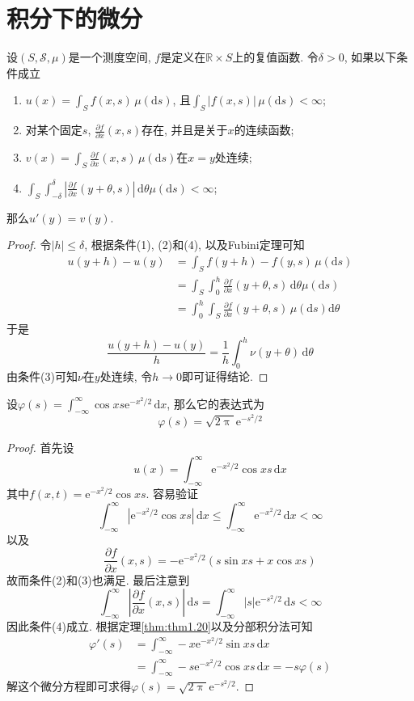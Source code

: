 \documentclass[cn, 12pt, math=mtpro2, bibstyle=apa, blue, twocol]{elegantbook}
\newcommand{\R}{\mathbb{R}}
\newcommand{\SE}{\mathcal{S}}
\begin{document}
\section{积分下的微分}
\begin{theorem}\label{thm:thm1.20}
  设$(S,\SE,\mu)$是一个测度空间, $f$是定义在$\R\times S$上的复值函数. 令$\delta>0$, 如果以下条件成立
  \begin{enumerate}[label=(\arabic*)]
    \item $u(x)=\int_Sf(x,s)\,\mu(\text{d}s)$, 且$\int_S|f(x,s)|\,\mu(\text{d}s)<\infty$;
    \item 对某个固定$s$, $\frac{\partial f}{\partial x}(x,s)$存在, 并且是关于$x$的连续函数;
    \item $v(x)=\int_S\frac{\partial f}{\partial x}(x,s)\,\mu(\text{d}s)$在$x=y$处连续;
    \item $\int_S\int_{-\delta}^{\delta}\left|\frac{\partial f}{\partial x}(y+\theta,s)\right|\,\text{d}\theta\mu(\text{d}s)<\infty$;
  \end{enumerate}
  那么$u'(y)=v(y)$.
\end{theorem}
\begin{proof}
  令$|h|\leq\delta$, 根据条件(1), (2)和(4), 以及Fubini定理可知
  \begin{align*}
  u(y+h)-u(y)&=\int_S f(y+h)-f(y,s)\,\mu(\text{d}s) \\
  &=\int_{S}\int_{0}^{h}\frac{\partial f}{\partial x}(y+\theta,s)\,\text{d}\theta\mu(\text{d}s) \\
  &=\int_{0}^{h}\int_S \frac{\partial f}{\partial x}(y+\theta,s)\,\mu(\text{d}s)\text{d}\theta
  \end{align*}
  于是
  $$\frac{u(y+h)-u(y)}{h}=\frac{1}{h}\int_{0}^{h}\nu(y+\theta)\,\text{d}\theta$$
  由条件(3)可知$\nu$在$y$处连续, 令$h\to0$即可证得结论.
\end{proof}
\begin{example}
设$\varphi(s)=\int_{-\infty}^{\infty}\cos xs\text{e}^{-x^2/2}\,\text{d}x$, 那么它的表达式为
$$\varphi(s)=\sqrt{2\uppi}\text{e}^{-s^2/2}$$
\end{example}
\begin{proof}
  首先设
  $$u(x)=\int_{-\infty}^{\infty}\text{e}^{-x^2/2}\cos xs\,\text{d}x$$
  其中$f(x,t)=\text{e}^{-x^2/2}\cos xs$. 容易验证
  $$\int_{-\infty}^{\infty}|\text{e}^{-x^2/2}\cos xs|\,\text{d}x\leq \int_{-\infty}^{\infty}\text{e}^{-x^2/2}\,\text{d}x<\infty$$
  以及
  $$\frac{\partial f}{\partial x}(x,s)=-\text{e}^{-x^2/2}(s\sin xs+x\cos xs)$$
  故而条件(2)和(3)也满足. 最后注意到
  $$\int_{-\infty}^{\infty}\left|\frac{\partial f}{\partial x}(x,s)\right|\,\text{d}s=\int_{-\infty}^{\infty}|s|\text{e}^{-s^2/2}\,\text{d}s<\infty$$
  因此条件(4)成立. 根据定理\ref{thm:thm1.20}以及分部积分法可知
  \begin{align*}
  \varphi'(s)&=\int_{-\infty}^{\infty}-x\text{e}^{-x^2/2}\sin xs\,\text{d}x \\
  &=\int_{-\infty}^{\infty}-s\text{e}^{-x^2/2}\cos xs\,\text{d}x=-s\varphi(s)
  \end{align*}
  解这个微分方程即可求得$\varphi(s)=\sqrt{2\uppi}\text{e}^{-s^2/2}$.
\end{proof}
\end{document}
